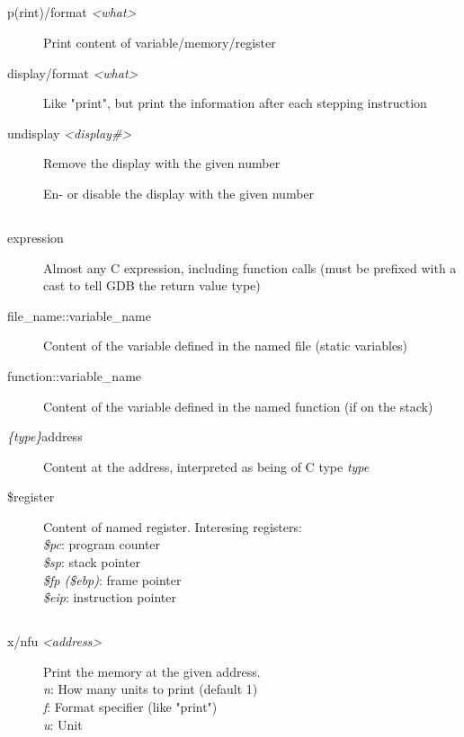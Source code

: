 \documentclass[10pt,landscape,a4paper]{article}
\newcommand{\blacksubsection}[1]{\subsection{\colorbox{black}{\makebox[\linewidth][c]{\textcolor{white}{#1}}}}}
\begin{document}
\begin{multicols}{3}
    \blacksubsection{Variables}
      \begin{description}
        \item[p(rint)/format \textit{<what>}] Print content of variable/memory/register
        \item[display/format \textit{<what>}] Like "print", but print the information after each stepping instruction
        \item[undisplay \textit{<display\#>}] Remove the display with the given number
        \item[\parbox{6cm}{ \vspace{0.1cm} enable display \textit{<display\#>} \\ disable display \textit{<display\#>} \vspace{0.1cm}}]
              En- or disable the display with the given number
      \end{description}

    \blacksubsection{<what>}
      \begin{description}
        \item[expression] Almost any C expression, including function calls (must be prefixed with a cast to tell GDB the return value type)
        \item[file\_name::variable\_name] Content of the variable defined in the named file (static variables)
        \item[function::variable\_name] Content of the variable defined in the named function (if on the stack)
        \item[\textit{\{type\}}address] Content at the address, interpreted as being of C type \textit{type}
        \item[\$register] \parbox{8cm}{Content of named register. Interesing registers: \\
                                       \textit{\$pc}: program counter\\
                                       \textit{\$sp}: stack pointer\\
                                       \textit{\$fp (\$ebp)}: frame pointer\\
                                       \textit{\$eip}: instruction pointer}
      \end{description}

    \blacksubsection{Memory}
      \begin{description}
        \item[x/nfu \textit{<address>}] \parbox{8cm}{Print the memory at the given address. \\
                                        \textit{n}: How many units to print (default 1) \\
                                        \textit{f}: Format specifier (like "print") \\
                                        \textit{u}: Unit}
      \end{description}


\end{multicols}
\end{document}
